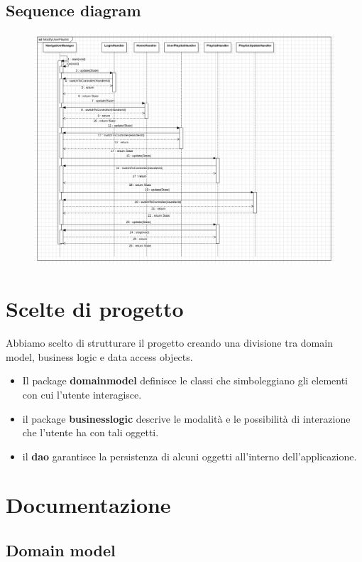 \documentclass{article}
\begin{document}
\subsection{Sequence diagram}
\begin{figure}[H]
\includegraphics[scale=0.30]{sequenze01}
\end{figure}

\section{Scelte di progetto}

Abbiamo scelto di strutturare il progetto creando una divisione tra domain model, business logic e data
access objects.
\begin{itemize}
  \item
    Il package  \textbf{domainmodel} definisce le classi che simboleggiano gli elementi con cui l'utente
    interagisce.
  \item
    il package \textbf{businesslogic} descrive le modalità e le possibilità di interazione che l'utente
    ha con tali oggetti.
  \item
    il \textbf{dao} garantisce la persistenza di alcuni oggetti all'interno dell'applicazione.

   \end{itemize}
    
\section{Documentazione}
   
\subsection{Domain model}
\end{document}
